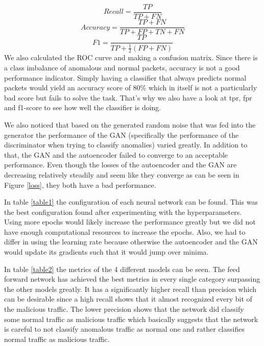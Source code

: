 \documentclass[]{article}
\begin{document}
	\begin{equation}
		Recall = \frac{TP}{TP + FN}
	\end{equation}
	\begin{equation}
		Accuracy = \frac{TP + FN}{TP+FP+TN+FN}
	\end{equation}
\begin{equation}
	F1 = \frac{TP}{TP + \frac{1}{2} (FP+FN)}
\end{equation}
	We also calculated the ROC curve and making a confusion matrix. Since there is a class imbalance of anomalous and normal packets, accuracy is not a good performance indicator. Simply having a classifier that always predicts normal packets would yield an accuracy score of 80\% which in itself is not a particularly bad score but fails to solve the task. That's why we also have a look at tpr, fpr and f1-score to see how well the classifier is doing.  
	
	We also noticed that based on the generated random noise that was fed into the generator the performance of the GAN (specifically the performance of the discriminator when trying to classify anomalies) varied greatly. In addition to that, the GAN and the autoencoder failed to converge to an acceptable performance. Even though the losses of the autoencoder and the GAN are decreasing relatively steadily and seem like they converge as can be seen in Figure \ref{loss}, they both have a bad performance.
	\newline
	
	\noindent
	In table \ref{table1} the configuration of each neural network can be found. This was the best configuration found after experimenting with the hyperparameters. Using more epochs would likely increase the performance greatly but we did not have enough computational resources to increase the epochs. Also, we had to differ in using the learning rate because otherwise the autoencoder and the GAN would update its gradients such that it would jump over minima. 
	
	In table \ref{table2} the metrics of the 4 different models can be seen. The feed forward network has achieved the best metrics in every single category surpassing the other models greatly. It has a significantly higher recall than precision which can be desirable since a high recall shows that it almost recognized every bit of the malicious traffic. The lower precision shows that the network did classify some normal traffic as malicious traffic which basically suggests that the network is careful to not classify anomalous traffic as normal one and rather classifies normal traffic as malicious traffic. 
	
\end{document}
